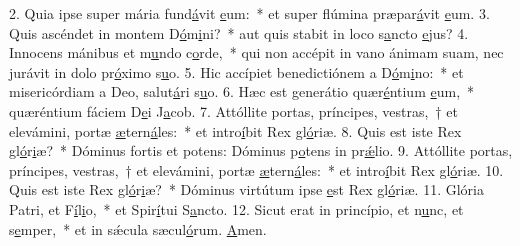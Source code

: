 2. Quia ipse super mária fund\uline{á}vit \uline{e}um:~* et super flúmina præpar\uline{á}vit \uline{e}um.
3. Quis ascéndet in montem D\uline{ó}m\uline{i}ni?~* aut quis stabit in loco s\uline{a}ncto \uline{e}jus?
4. Innocens mánibus et m\uline{u}ndo c\uline{o}rde,~* qui non accépit in vano ánimam suam, nec jurávit in dolo pr\uline{ó}ximo s\uline{u}o.
5. Hic accípiet benedictiónem a D\uline{ó}m\uline{i}no:~* et misericórdiam a Deo, salut\uline{á}ri s\uline{u}o.
6. Hæc est generátio quær\uline{é}ntium \uline{e}um,~* quæréntium fáciem D\uline{e}i J\uline{a}cob.
7. Attóllite portas, príncipes, vestras,~† et elevámini, portæ \uline{æ}tern\uline{á}les:~* et intro\uline{í}bit Rex gl\uline{ó}riæ.
8. Quis est iste Rex gl\uline{ó}r\uline{i}æ?~* Dóminus fortis et potens: Dóminus p\uline{o}tens in pr\uline{ǽ}lio.
9. Attóllite portas, príncipes, vestras,~† et elevámini, portæ \uline{æ}tern\uline{á}les:~* et intro\uline{í}bit Rex gl\uline{ó}riæ.
10. Quis est iste Rex gl\uline{ó}r\uline{i}æ?~* Dóminus virtútum ipse \uline{e}st Rex gl\uline{ó}riæ.
11. Glória Patri, et F\uline{í}l\uline{i}o,~* et Spir\uline{í}tui S\uline{a}ncto.
12. Sicut erat in princípio, et n\uline{u}nc, et s\uline{e}mper,~* et in sǽcula sæcul\uline{ó}rum. \uline{A}men.

